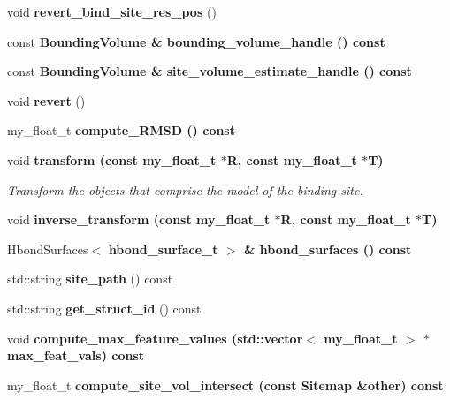 \begin{CompactItemize}
\item 
void \textbf{revert\_\-bind\_\-site\_\-res\_\-pos} ()\label{classASCbase_1_1Sitemap_2411adae66ef848c5bfe67d55c07e672}

\item 
const \bf{Bounding\-Volume} \& \textbf{bounding\_\-volume\_\-handle} () const \label{classASCbase_1_1Sitemap_3ba92f5ed263d28b96b29085c197abed}

\item 
const \bf{Bounding\-Volume} \& \textbf{site\_\-volume\_\-estimate\_\-handle} () const \label{classASCbase_1_1Sitemap_ad6269d1f92809bbf093a0c6f6c8442a}

\item 
void \textbf{revert} ()\label{classASCbase_1_1Sitemap_85a7198a79dd727691347e20c5ffffef}

\item 
my\_\-float\_\-t \bf{compute\_\-RMSD} () const 
\item 
void \bf{transform} (const my\_\-float\_\-t $\ast$R, const my\_\-float\_\-t $\ast$T)\label{classASCbase_1_1Sitemap_5dc7a050ffc9ae70c203cb31e41b4b77}

\begin{CompactList}\small\item\em Transform the objects that comprise the model of the binding site. \item\end{CompactList}\item 
void \bf{inverse\_\-transform} (const my\_\-float\_\-t $\ast$R, const my\_\-float\_\-t $\ast$T)
\item 
Hbond\-Surfaces$<$ \bf{hbond\_\-surface\_\-t} $>$ \& \textbf{hbond\_\-surfaces} () const \label{classASCbase_1_1Sitemap_9e75ff867b2874ad6365c5c67c27a941}

\item 
std::string \textbf{site\_\-path} () const \label{classASCbase_1_1Sitemap_25f76f5d2bfbce099424bce78913d77b}

\item 
std::string \textbf{get\_\-struct\_\-id} () const \label{classASCbase_1_1Sitemap_325a5ef0a4b1949fd1d7eb8622a91802}

\item 
void \bf{compute\_\-max\_\-feature\_\-values} (std::vector$<$ my\_\-float\_\-t $>$ $\ast$max\_\-feat\_\-vals) const 
\item 
my\_\-float\_\-t \bf{compute\_\-site\_\-vol\_\-intersect} (const \bf{Sitemap} \&other) const 
\end{CompactItemize}
